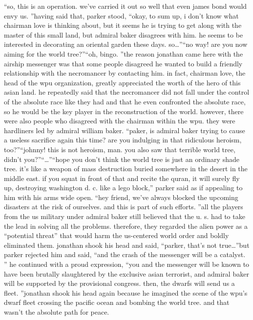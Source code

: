 “so, this is an operation.
 we’ve carried it out so well that even james bond would envy us.
”having said that, parker stood, “okay, to sum up, i don’t know what chairman love is thinking about, but it seems he is trying to get along with the master of this small land, but admiral baker disagrees with him.
 he seems to be interested in decorating an oriental garden these days.
 so…”“no way! are you now aiming for the world tree?”“oh, bingo.
”the reason jonathan came here with the airship messenger was that some people disagreed he wanted to build a friendly relationship with the necromancer by contacting him.
in fact, chairman love, the head of the wpu organization, greatly appreciated the worth of the hero of this asian land.
 he repeatedly said that the necromancer did not fall under the control of the absolute race like they had and that he even confronted the absolute race, so he would be the key player in the reconstruction of the world.
however, there were also people who disagreed with the chairman within the wpu.
 they were hardliners led by admiral william baker.
“paker, is admiral baker trying to cause a useless sacrifice again this time? are you indulging in that ridiculous heroism, too?”“johnny! this is not heroism, man.
 you also saw that terrible world tree, didn’t you?”“…”“hope you don’t think the world tree is just an ordinary shade tree.
 it’s like a weapon of mass destruction buried somewhere in the desert in the middle east.
 if you squat in front of that and recite the quran, it will surely fly up, destroying washington d.
c.
 like a lego block,” parker said as if appealing to him with his arms wide open.
 “hey friend, we’ve always blocked the upcoming disasters at the risk of ourselves.
 and this is part of such efforts.
”all the players from the us military under admiral baker still believed that the u.
s.
 had to take the lead in solving all the problems.
 therefore, they regarded the alien power as a “potential threat” that would harm the us-centered world order and boldly eliminated them.
jonathan shook his head and said, “parker, that’s not true…”but parker rejected him and said, “and the crash of the messenger will be a catalyst.
”
he continued with a proud expression, “you and the messenger will be known to have been brutally slaughtered by the exclusive asian terrorist, and admiral baker will be supported by the provisional congress.
 then, the dwarfs will send us a fleet.
”jonathan shook his head again because he imagined the scene of the wpu’s dwarf fleet crossing the pacific ocean and bombing the world tree.
and that wasn’t the absolute path for peace.
